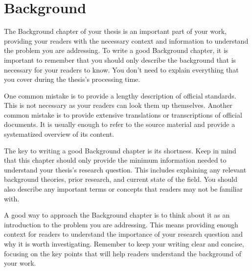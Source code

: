 \chapter{Background} \label{chap:background}

The Background chapter of your thesis is an important part of your work, providing your readers with the necessary context and information to understand the problem you are addressing. To write a good Background chapter, it is important to remember that you should only describe the background that is necessary for your readers to know. You don't need to explain everything that you cover during the thesis's processing time.

One common mistake is to provide a lengthy description of official standards. This is not necessary as your readers can look them up themselves.
Another common mistake is to provide extensive translations or transcriptions of official documents.
It is usually enough to refer to the source material and provide a systematized overview of its content.

The key to writing a good Background chapter is its shortness. Keep in mind that this chapter should only provide the minimum information needed to understand your thesis's research question.
This includes explaining any relevant background theories, prior research, and current state of the field.
You should also describe any important terms or concepts that readers may not be familiar with.

A good way to approach the Background chapter is to think about it as an introduction to the problem you are addressing. This means providing enough context for readers to understand the importance of your research question and why it is worth investigating. Remember to keep your writing clear and concise, focusing on the key points that will help readers understand the background of your work.